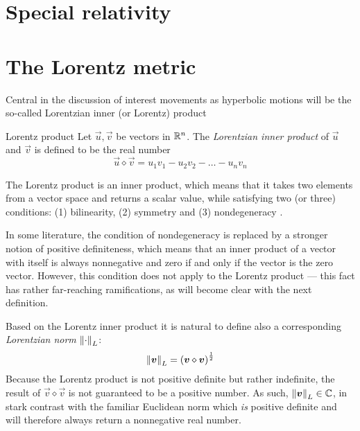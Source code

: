 \section{Special relativity}

\section{The Lorentz metric}
\label{sec:lorentz_metric}
Central in the discussion of interest movements as hyperbolic motions will be the so-called Lorentzian inner (or Lorentz) product

\begin{block}{Lorentz product}
    Let \(\vec{u}, \vec{v}\) be vectors in \(\mathbb{R}^n\). The \emph{Lorentzian inner product} of \(\vec{u}\) and \(\vec{v}\) is defined to be the real number
    \[
     \vec{u} \diamond \vec{v} = u_1v_1 - u_2v_2 - \ldots - u_nv_n
\]
\end{block}
The Lorentz product is an inner product, which means that it takes two elements from a vector space and returns a scalar value, while satisfying two (or three) conditions: (1) bilinearity, (2) symmetry and (3) nondegeneracy \cite{Ratcliffe2019}.

In some literature, the condition of nondegeneracy is replaced by a stronger notion of positive definiteness, which means that an inner product of a vector with itself is always nonnegative and zero if and only if the vector is the zero vector. However, this condition does not apply to the Lorentz product --- this fact has rather far-reaching ramifications, as will become clear with the next definition. 

Based on the Lorentz inner product it is natural to define also a corresponding \emph{Lorentzian norm} \(\norm{\cdot}_L\):
    \[
     \norm{\vb*{v}}_L = \qty(\vb*{v}\diamond\vb*{v})^\frac{1}{2}
\]
Because the Lorentz product is not positive definite but rather indefinite, the result of \(\vec{v}\diamond\vec{v}\) is not guaranteed to be a positive number. As such, \(\norm{\vb*{v}}_L \in \mathbb{C}\), in stark contrast with the familiar Euclidean norm which \emph{is} positive definite and will therefore always return a nonnegative real number.


